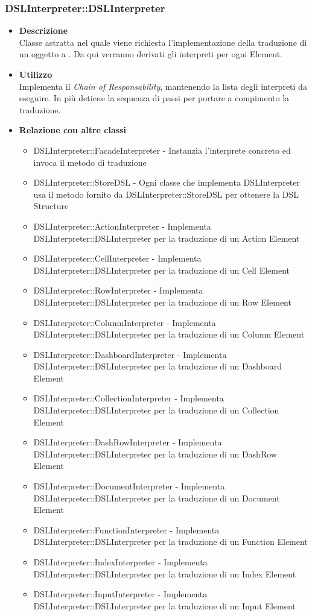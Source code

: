 \subsubsection{DSLInterpreter::DSLInterpreter}
\begin{itemize}
\item \textbf{Descrizione} \hfill \\
  Classe astratta nel quale viene richiesta l'implementazione della traduzione di un oggetto a . Da qui verranno derivati gli interpreti per ogni  Element.
\item \textbf{Utilizzo} \hfill \\
  Implementa il \textit{Chain of Responsability}, mantenendo la lista degli interpreti da eseguire. In più detiene la sequenza di passi per portare a compimento la traduzione.
\item \textbf{Relazione con altre classi} \hfill
  \begin{itemize}
  \item DSLInterpreter::FacadeInterpreter - Instanzia l'interprete concreto ed invoca il metodo di traduzione
  \item DSLInterpreter::StoreDSL - Ogni classe che implementa DSLInterpreter usa il metodo fornito da DSLInterpreter::StoreDSL per ottenere la DSL Structure
  \item DSLInterpreter::ActionInterpreter - Implementa DSLInterpreter::DSLInterpreter per la traduzione di un Action Element
  \item DSLInterpreter::CellInterpreter - Implementa DSLInterpreter::DSLInterpreter per la traduzione di un Cell Element
  \item DSLInterpreter::RowInterpreter - Implementa DSLInterpreter::DSLInterpreter per la traduzione di un Row Element
  \item DSLInterpreter::ColumnInterpreter - Implementa DSLInterpreter::DSLInterpreter per la traduzione di un Column Element
  \item DSLInterpreter::DashboardInterpreter - Implementa DSLInterpreter::DSLInterpreter per la traduzione di un Dashboard Element
  \item DSLInterpreter::CollectionInterpreter - Implementa DSLInterpreter::DSLInterpreter per la traduzione di un Collection Element
  \item DSLInterpreter::DashRowInterpreter - Implementa DSLInterpreter::DSLInterpreter per la traduzione di un DashRow Element
  \item DSLInterpreter::DocumentInterpreter - Implementa DSLInterpreter::DSLInterpreter per la traduzione di un Document Element
  \item DSLInterpreter::FunctionInterpreter - Implementa DSLInterpreter::DSLInterpreter per la traduzione di un Function Element
  \item DSLInterpreter::IndexInterpreter - Implementa DSLInterpreter::DSLInterpreter per la traduzione di un Index Element
  \item DSLInterpreter::InputInterpreter - Implementa DSLInterpreter::DSLInterpreter per la traduzione di un Input Element
  \end{itemize}
\end{itemize}

